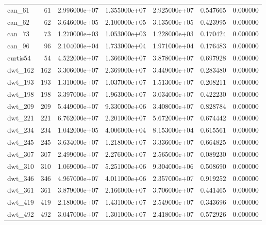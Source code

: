 \begin{tabular}{lrrrrrr}
can\_61                  &   61 &  2.996000e+07 &  1.355000e+07 &  2.925000e+07 &  0.547665 &  0.000000 \\
can\_62                  &   62 &  3.646000e+05 &  2.100000e+05 &  3.135000e+05 &  0.423995 &  0.000000 \\
can\_73                  &   73 &  1.270000e+03 &  1.053000e+03 &  1.228000e+03 &  0.170424 &  0.000000 \\
can\_96                  &   96 &  2.104000e+04 &  1.733000e+04 &  1.971000e+04 &  0.176483 &  0.000000 \\
curtis54                &   54 &  4.522000e+07 &  1.366000e+07 &  3.878000e+07 &  0.697928 &  0.000000 \\
dwt\_162                 &  162 &  3.306000e+07 &  2.369000e+07 &  3.449000e+07 &  0.283480 &  0.000000 \\
dwt\_193                 &  193 &  1.310000e+07 &  1.037000e+07 &  1.513000e+07 &  0.208211 &  0.000000 \\
dwt\_198                 &  198 &  3.397000e+07 &  1.963000e+07 &  3.034000e+07 &  0.422230 &  0.000000 \\
dwt\_209                 &  209 &  5.449000e+07 &  9.330000e+06 &  3.408000e+07 &  0.828784 &  0.000000 \\
dwt\_221                 &  221 &  6.762000e+07 &  2.201000e+07 &  5.672000e+07 &  0.674442 &  0.000000 \\
dwt\_234                 &  234 &  1.042000e+05 &  4.006000e+04 &  8.153000e+04 &  0.615561 &  0.000000 \\
dwt\_245                 &  245 &  3.634000e+07 &  1.218000e+07 &  3.336000e+07 &  0.664825 &  0.000000 \\
dwt\_307                 &  307 &  2.499000e+07 &  2.276000e+07 &  2.565000e+07 &  0.089230 &  0.000000 \\
dwt\_310                 &  310 &  1.069000e+07 &  5.251000e+06 &  9.304000e+06 &  0.508690 &  0.000000 \\
dwt\_346                 &  346 &  4.967000e+07 &  4.011000e+06 &  2.357000e+07 &  0.919252 &  0.000000 \\
dwt\_361                 &  361 &  3.879000e+07 &  2.166000e+07 &  3.706000e+07 &  0.441465 &  0.000000 \\
dwt\_419                 &  419 &  2.180000e+07 &  1.431000e+07 &  2.549000e+07 &  0.343696 &  0.000000 \\
dwt\_492                 &  492 &  3.047000e+07 &  1.301000e+07 &  2.418000e+07 &  0.572926 &  0.000000 \\

\end{tabular}
